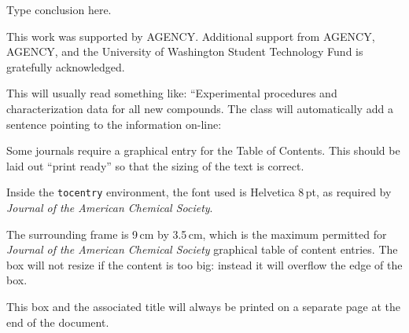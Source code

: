 \documentclass[english,journal=jctcce,etalmode=truncate,maxauthors=0]{achemso}
\begin{document}
Type conclusion here.

\begin{acknowledgement}
	This work was supported by AGENCY. Additional support from AGENCY, AGENCY, and the University of Washington Student Technology Fund is gratefully acknowledged.
\end{acknowledgement}

\begin{suppinfo}
	This will usually read something like: ``Experimental procedures and characterization data for all new compounds. The class will automatically add a sentence pointing to the information on-line:
\end{suppinfo}

\newpage %

\begin{tocentry}

Some journals require a graphical entry for the Table of Contents.
This should be laid out ``print ready'' so that the sizing of the
text is correct.

Inside the \texttt{tocentry} environment, the font used is Helvetica
8\,pt, as required by \emph{Journal of the American Chemical
Society}.

The surrounding frame is 9\,cm by 3.5\,cm, which is the maximum
permitted for  \emph{Journal of the American Chemical Society}
graphical table of content entries. The box will not resize if the
content is too big: instead it will overflow the edge of the box.

This box and the associated title will always be printed on a
separate page at the end of the document.

\end{tocentry}
\end{document}

